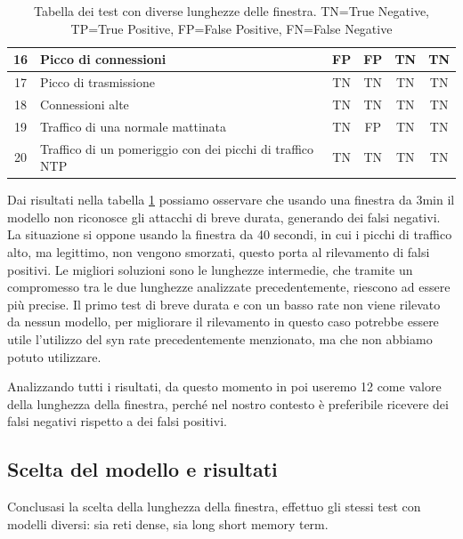 \begin{table}
\begin{tabularx}{\textwidth}{||c X c c c c||}
        \hline 
        16 & Picco di connessioni & \cellcolor{orange} FP & \cellcolor{orange} FP & TN & TN\\        
        \hline
        17 & Picco di trasmissione & TN & TN & TN & TN\\        
        \hline
        18 & Connessioni alte & TN & TN & TN & TN\\
        \hline
        19 & Traffico di una normale mattinata & TN & \cellcolor{orange} FP & TN & TN\\ 
        \hline
        20 & Traffico di un pomeriggio con dei picchi di traffico NTP & TN & TN & TN & TN\\ 
        \hline
    \end{tabularx}
    \caption{Tabella dei test con diverse lunghezze delle finestra. TN=True Negative, TP=True Positive, FP=False Positive, FN=False Negative}
    \label{table:finestra}
\end{table}
\FloatBarrier

Dai risultati nella tabella \ref{table:finestra} possiamo osservare che usando una finestra da 3min il modello non riconosce gli attacchi di breve durata, generando dei falsi negativi. La situazione si oppone usando la finestra da 40 secondi, in cui i picchi di traffico alto, ma legittimo, non vengono smorzati, questo porta al rilevamento di falsi positivi. Le migliori soluzioni sono le lunghezze intermedie, che tramite un compromesso tra le due lunghezze analizzate precedentemente, riescono ad essere più precise.
Il primo test di breve durata e con un basso rate non viene rilevato da nessun modello, per migliorare il rilevamento in questo caso potrebbe essere utile l'utilizzo del syn rate precedentemente menzionato, ma che non abbiamo potuto utilizzare.

Analizzando tutti i risultati, da questo momento in poi useremo 12 come valore della lunghezza della finestra, perché nel nostro contesto è preferibile ricevere dei falsi negativi rispetto a dei falsi positivi.


\subsection{Scelta del modello e risultati}

Conclusasi la scelta della lunghezza della finestra, effettuo gli stessi test con modelli diversi: sia reti dense, sia long short memory term.


